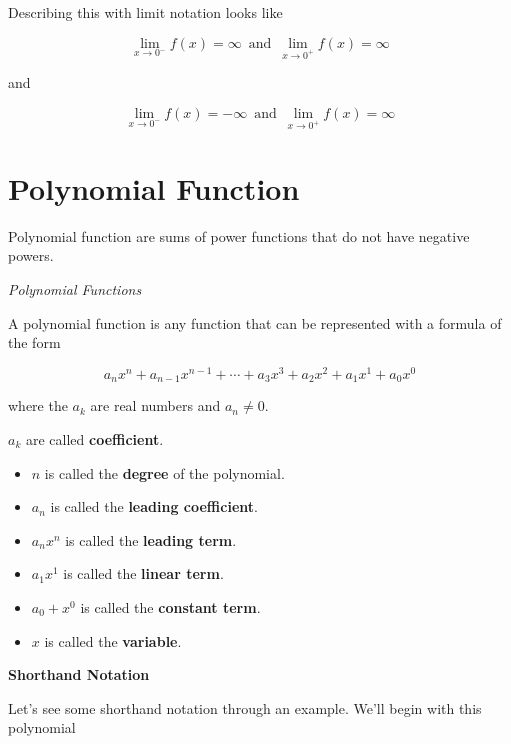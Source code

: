 \documentclass{ximera}
\begin{document}
Describing this with limit notation looks like




\[    \lim_{x \to 0^-} f(x) =  \infty  \,   \text{ and }  \,     \lim_{x \to 0^+} f(x) = \infty      \]


and 

\[    \lim_{x \to 0^-} f(x) =  -\infty  \,   \text{ and }  \,     \lim_{x \to 0^+} f(x) = \infty      \]









\section{Polynomial Function}


Polynomial function are sums of power functions that do not have negative powers.


\begin{definition} \textit{Polynomial Functions}

A polynomial function is any function that can be represented with a formula of the form

\[    a_n x^n + a_{n-1} x^{n-1} + \cdots + a_3 x^3 + a_2 x^2 + a_1 x^1 + a_0 x^0      \]

where the $a_k$ are real numbers and $a_n \ne 0$.

$a_k$ are called \textbf{coefficient}.



\begin{itemize}
\item $n$ is called the \textbf{degree} of the polynomial.
\item $a_n$ is called the \textbf{leading coefficient}.
\item $a_n x^n$ is called the \textbf{leading term}.
\item $a_1 x^1$ is called the \textbf{linear term}.
\item $a_0 + x^0$ is called the \textbf{constant term}.
\item $x$ is called the \textbf{variable}.
\end{itemize}


\end{definition}




\textbf{Shorthand Notation}


Let's see some shorthand notation through an example.  We'll begin with this polynomial
\end{document}

